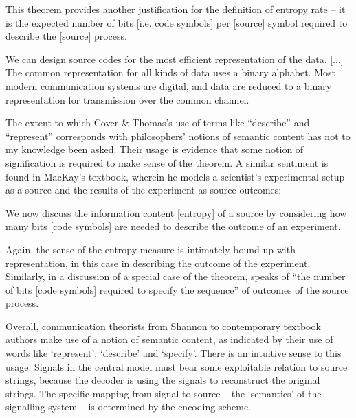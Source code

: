 \documentclass[12pt]{article}
\begin{document}
\begin{myquote}
This theorem provides another justification for the definition of entropy rate -- it is the expected number of bits [i.e. code symbols] per [source] symbol required to describe the [source] process.
\par\hspace*{\fill}\citet[115]{cover2006elements}
\end{myquote}

\begin{myquote}
We can design source codes for the most efficient representation of the data. [...] The common representation for all kinds of data uses a binary alphabet. Most modern communication systems are digital, and data are reduced to a binary representation for transmission over the common channel.
\par\hspace*{\fill}\citet[218]{cover2006elements}
\end{myquote}

\noindent The extent to which Cover \& Thomas's use of terms like ``describe'' and ``represent'' corresponds with philosophers' notions of semantic content has not to my knowledge been asked.
Their usage is evidence that some notion of signification is required to make sense of the theorem.
A similar sentiment is found in MacKay's textbook, wherein he models a scientist's experimental setup as a source and the results of the experiment as source outcomes:

\begin{myquote}
We now discuss the information content [entropy] of a source by considering how many bits [code symbols] are needed to describe the outcome of an experiment.
\par\hspace*{\fill}\citet[73]{mackay2003information}
\end{myquote}

\noindent Again, the sense of the entropy measure is intimately bound up with representation, in this case in describing the outcome of the experiment.
Similarly, in a discussion of a special case of the theorem, \citet[397]{shannon1948mathematicalc} speaks of ``the number of bits [code symbols] required to specify the sequence'' of outcomes of the source process.

Overall, communication theorists from Shannon to contemporary textbook authors make use of a notion of semantic content, as indicated by their use of words like `represent', `describe' and `specify'.
There is an intuitive sense to this usage.
Signals in the central model must bear some exploitable relation to source strings, because the decoder is using the signals to reconstruct the original strings.
The specific mapping from signal to source -- the `semantics' of the signalling system -- is determined by the encoding scheme.
\end{document}

